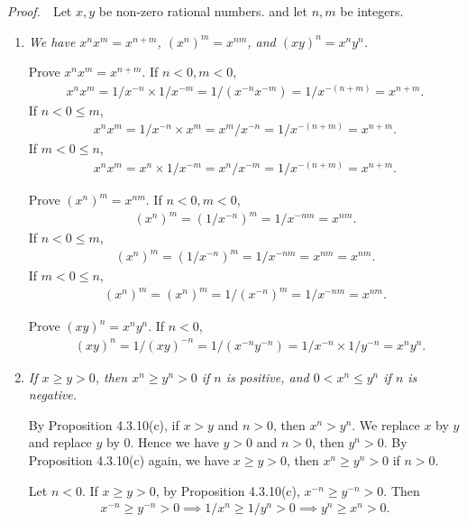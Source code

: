 \documentclass{book}
\newcommand{\pff}{\vspace{.25em}\noindent\emph{Proof.}~~}
\begin{document}
\pff Let $x,y$ be non-zero rational numbers. and let $n,m$ be integers.
\begin{enumerate}
    \item \emph{We have $x^nx^m=x^{n+m}$, $(x^n)^m=x^{nm}$, and $(xy)^n=x^ny^n$.}

    Prove $x^nx^m=x^{n+m}$. If $n<0,m<0$,
        \begin{align*}
            x^{n}x^{m}=1/x^{-n}\times 1/x^{-m}=1/(x^{-n}x^{-m})=1/x^{-(n+m)}=x^{n+m}.
        \end{align*}
    If $n<0\leq m$,
        \begin{align*}
            x^{n}x^{m}=1/x^{-n}\times x^m=x^m/x^{-n}=1/x^{-(n+m)}=x^{n+m}.
        \end{align*}
    If $m<0\leq n$,
        \begin{align*}
            x^{n}x^{m}=x^n\times 1/x^{-m}=x^n/x^{-m}=1/x^{-(n+m)}=x^{n+m}.
        \end{align*}

    Prove $(x^n)^m=x^{nm}$. If $n<0,m<0$,
        \begin{align*}
            (x^{n})^{m}=(1/x^{-n})^{m}=1/x^{-nm}=x^{nm}.
        \end{align*}
    If $n<0\leq m$,
        \begin{align*}
            (x^{n})^{m}=(1/x^{-n})^{m}=1/x^{-nm}=x^{nm}=x^{nm}.
        \end{align*}
    If $m<0\leq n$,
        \begin{align*}
            (x^{n})^{m}=(x^n)^{m}=1/(x^{-n})^m=1/x^{-nm}=x^{nm}.
        \end{align*}

    Prove $(xy)^n=x^ny^n$. If $n<0$,
        \begin{align*}
            &(xy)^{n}=1/(xy)^{-n}=1/(x^{-n}y^{-n})=1/x^{-n}\times 1/y^{-n}=x^{n}y^{n}.
        \end{align*}

    \item \emph{If $x\geq y>0$, then $x^n\geq y^n>0$ if $n$ is positive, and $0<x^n\leq y^n$ if $n$ is negative.}
    
    By Proposition 4.3.10(c), if $x>y$ and $n>0$, then $x^n>y^n$. We replace $x$ by $y$ and replace $y$ by $0$. Hence we have $y>0$ and $n>0$, then $y^n>0$. By Proposition 4.3.10(c) again, we have $x\geq y>0$, then $x^n\geq y^n>0$ if $n>0$.

    Let $n<0$. If $x\geq y>0$, by Proposition 4.3.10(c), $x^{-n}\geq y^{-n}>0$. Then
        \begin{align*}
            x^{-n}\geq y^{-n}>0\implies 1/x^{n}\geq 1/y^{n}>0\implies y^{n}\geq x^{n}>0.
        \end{align*}


\end{enumerate}
\end{document}
